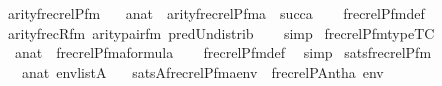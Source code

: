 \begin{isabellebody}
\isanewline
{}\isamarkupfalse%
\ arity{\isacharunderscore}{\kern0pt}frecrelP{\isacharunderscore}{\kern0pt}fm\ {\isacharcolon}{\kern0pt}\isanewline
\ \ {\isachardoublequoteopen}a{\isasymin}nat\ {\isasymLongrightarrow}\ arity{\isacharparenleft}{\kern0pt}frecrelP{\isacharunderscore}{\kern0pt}fm{\isacharparenleft}{\kern0pt}a{\isacharparenright}{\kern0pt}{\isacharparenright}{\kern0pt}\ {\isacharequal}{\kern0pt}\ succ{\isacharparenleft}{\kern0pt}a{\isacharparenright}{\kern0pt}{\isachardoublequoteclose}\isanewline
%
\isadelimproof
\ \ %
\endisadelimproof
%
\isatagproof
{}\isamarkupfalse%
\ frecrelP{\isacharunderscore}{\kern0pt}fm{\isacharunderscore}{\kern0pt}def\isanewline
\ \ \isamarkupfalse%
\ arity{\isacharunderscore}{\kern0pt}frecR{\isacharunderscore}{\kern0pt}fm\ arity{\isacharunderscore}{\kern0pt}pair{\isacharunderscore}{\kern0pt}fm\ pred{\isacharunderscore}{\kern0pt}Un{\isacharunderscore}{\kern0pt}distrib\isanewline
\ \ \isamarkupfalse%
\ simp%
\endisatagproof
{\isafoldproof}%
%
\isadelimproof
\isanewline
%
\endisadelimproof
\isanewline
{}\isamarkupfalse%
\ frecrelP{\isacharunderscore}{\kern0pt}fm{\isacharunderscore}{\kern0pt}type{\isacharbrackleft}{\kern0pt}TC{\isacharbrackright}{\kern0pt}\ {\isacharcolon}{\kern0pt}\isanewline
\ \ {\isachardoublequoteopen}a{\isasymin}nat\ {\isasymLongrightarrow}\ frecrelP{\isacharunderscore}{\kern0pt}fm{\isacharparenleft}{\kern0pt}a{\isacharparenright}{\kern0pt}{\isasymin}formula{\isachardoublequoteclose}\isanewline
%
\isadelimproof
\ \ %
\endisadelimproof
%
\isatagproof
{}\isamarkupfalse%
\ frecrelP{\isacharunderscore}{\kern0pt}fm{\isacharunderscore}{\kern0pt}def\ \isamarkupfalse%
\ simp%
\endisatagproof
{\isafoldproof}%
%
\isadelimproof
\isanewline
%
\endisadelimproof
\isanewline
{}\isamarkupfalse%
\ sats{\isacharunderscore}{\kern0pt}frecrelP{\isacharunderscore}{\kern0pt}fm\ {\isacharcolon}{\kern0pt}\isanewline
\ \ \ {\isachardoublequoteopen}a{\isasymin}nat{\isachardoublequoteclose}\ {\isachardoublequoteopen}env{\isasymin}list{\isacharparenleft}{\kern0pt}A{\isacharparenright}{\kern0pt}{\isachardoublequoteclose}\isanewline
\ \ \ {\isachardoublequoteopen}sats{\isacharparenleft}{\kern0pt}A{\isacharcomma}{\kern0pt}frecrelP{\isacharunderscore}{\kern0pt}fm{\isacharparenleft}{\kern0pt}a{\isacharparenright}{\kern0pt}{\isacharcomma}{\kern0pt}env{\isacharparenright}{\kern0pt}\ {\isasymlongleftrightarrow}\ frecrelP{\isacharparenleft}{\kern0pt}{\isacharhash}{\kern0pt}{\isacharhash}{\kern0pt}A{\isacharcomma}{\kern0pt}nth{\isacharparenleft}{\kern0pt}a{\isacharcomma}{\kern0pt}\ env{\isacharparenright}{\kern0pt}{\isacharparenright}{\kern0pt}{\isachardoublequoteclose}\isanewline

\end{isabellebody}
